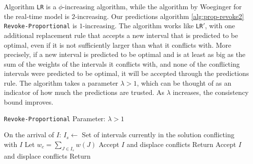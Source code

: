 Algorithm \texttt{LR} is a $\phi$-increasing algorithm, while the algorithm by Woeginger \cite{woeginger1994line} for the real-time model is $2$-increasing. Our predictions algorithm \ref{alg:prop-revoke2} \texttt{Revoke-Proportional} is $1$-increasing. The algorithm works like \texttt{LR$'$}, with one additional replacement rule that accepts a new interval that is predicted to be optimal, even if it is not sufficiently larger than what it conflicts with. More precisely, if a new interval is predicted to be optimal and is at least as big as the sum of the weights of the intervals it conflicts with, and none of the conflicting intervals were predicted to be optimal, it will be accepted through the predictions rule. The algorithm takes a parameter $\lambda > 1$, which can be thought of as an indicator of how much the predictions are trusted. As $\lambda$ increases, the consistency bound improves.

\begin{algorithm}
\caption{\texttt{Revoke-Proportional} {\hfil Parameter: $\lambda > 1$ }}\label{alg:prop-revoke2}
\begin{algorithmic}
\State On the arrival of $I$:
\State $I_{s} \gets $ Set of intervals currently in the solution conflicting with $I$
\State Let $w_c = \sum_{J \in I_s} w(J)$ 
 
    \State Accept $I$ and displace conflicts
    \State Return
  
    \State Accept $I$ and displace conflicts
    \State Return
    \EndIf
\EndIf
\end{algorithmic}
\end{algorithm}

